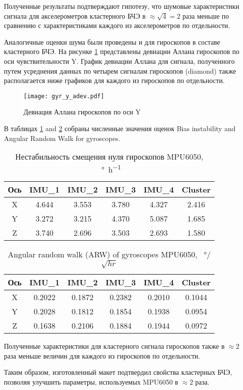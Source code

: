 Полученные результаты подтверждают гипотезу, что шумовые характеристики сигнала для акселерометров кластерного БЧЭ в $\approx\sqrt{4} = 2$ раза меньше по сравнению с характеристиками каждого
из акселерометров по отдельности.

Аналогичные оценки шума были проведены и для гироскопов в составе кластерного БЧЭ. На рисунке \ref{fig:gyr_y_allan} представлены девиации Аллана гироскопов по оси чувствительности Y.
График девиации Аллана для сигнала, полученного путем усреднения данных по четырем сигналам гироскопов (diamond) также располагается ниже графиков для каждого из гироскопов по отдельности.

\begin{figure}[h!]
	\centering
	\texttt{[image: gyr\_y\_adev.pdf]}
	\caption{Девиация Аллана гироскопов по оси Y}
	\label{fig:gyr_y_allan}
\end{figure}

В таблицах \ref{table:gyro_bias} and \ref{table:gyro_arw} собраны численные значения оценок Bias instability and Angular Random Walk for gyroscopes.

\begin{table}[h!]
	\centering
	\caption{Нестабильность смещения нуля гироскопов MPU6050, \SI[per-mode=symbol]{}{\degree\per\hour}}
	\begin{tabular}{| c | c | c | c | c | c |}
	\hline
	Ось & IMU\_1 & IMU\_2 & IMU\_3 & IMU\_4 & Cluster \\ \hline
	X & 4.644 & 3.553 & 3.780 & 4.327 & 2.416 \\ \hline
	Y & 3.272 & 3.215 & 4.370 & 5.087 & 1.685 \\ \hline
	Z & 3.740 & 2.696 & 3.503 & 2.693 & 1.580 \\
	\hline
	\end{tabular}
	\label{table:gyro_bias}
\end{table}

\begin{table}[h!]
	\centering
	\caption{Angular random walk (ARW) of gyroscopes MPU6050, \SI[per-mode=symbol]{}{\degree}/$\sqrt{hr}$}
	\begin{tabular}{| c | c | c | c | c | c |}
	\hline
	Ось & IMU\_1 & IMU\_2 & IMU\_3 & IMU\_4 & Cluster \\ \hline
	X & 0.2022 & 0.1872 & 0.2382 & 0.2010 & 0.1044 \\ \hline
	Y & 0.2028 & 0.1812 & 0.1854 & 0.1938 & 0.0954 \\ \hline
	Z & 0.1638 & 0.2106 & 0.1884 & 0.1944 & 0.0972 \\
	\hline
	\end{tabular}
	\label{table:gyro_arw}
\end{table}

Полученные характеристики для кластерного сигнала гироскопов также в $\approx2$ раза меньше величин для каждого из гироскопов по отдельности.

Таким образом, изготовленный макет подтвердил свойства кластерных БЧЭ, позволяя улучшить параметры, используемых MPU6050 в $\approx2$ раза.

\newpage